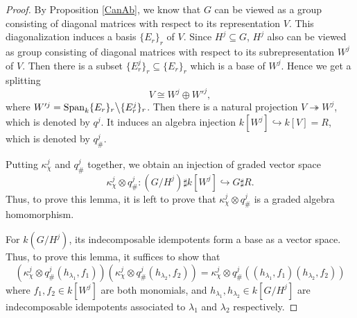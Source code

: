 \documentclass[11pt,reqno]{amsart}
\theoremstyle{definition}
\begin{document}
\begin{proof}
By Proposition \ref{CanAb}, we know that $G$ can be viewed as a
group consisting of diagonal matrices with respect to its 
representation $V$. This diagonalization induces a basis $\{E_r \}_r$ of $V$. 
Since $H^j \subseteq G$, 
$H^j$ also can be viewed as 
group consisting of diagonal matrices with respect to its 
subrepresentation $W^j$ of $V$. Then there is a subset 
$\{E^j_r\}_r \subseteq \{E_r \}_r$ which is a base of $W^j$.  
Hence we get a splitting
$$V \cong W^j \oplus W'^j,$$
where $W'^j = 
\mathrm{Span}_{k} \{E_r \}_r 
\big\backslash \{E^j_r\}_r$. 
Then there is a natural projection 
$V \twoheadrightarrow W^j$, which is 
denoted by $q^j$. 
It induces an algebra injection 
$k[W^j] \hookrightarrow k[V] = R$, 
which is denoted by $q^j_{\#}$. 

Putting 
$\kappa^{j}_{\chi}$ and $q^j_{\#}$ together, 
we obtain an injection of graded vector space 
$$
\kappa^{j}_{\chi} \otimes q^j_{\#}: (G / H^j) \sharp k[W^{j}] \hookrightarrow G \sharp R. 
$$
Thus, to prove this lemma, it is left to prove that $\kappa^{j}_{\chi} 
\otimes q^j_{\#}$ is a graded algebra homomorphism. 

For $k(G / H^j)$, its indecomposable idempotents form 
a base
as a vector space. Thus, to prove this lemma, it suffices to show that 
$$
(\kappa^{j}_{\chi} \otimes q^j_{\#}(h_{\lambda_1}, f_1) )
 (\kappa^{j}_{\chi} \otimes q^j_{\#}(h_{\lambda_2}, f_2) ) = 
\kappa^{j}_{\chi} \otimes q^j_{\#}((h_{\lambda_1}, f_1)(h_{\lambda_2}, f_2) )
$$
where $f_1, f_2 \in k[W^j]$ are both monomials, 
and $h_{\lambda_1}, h_{\lambda_2} \in k[G/H^j]$ are indecomposable 
idempotents associated 
to $\lambda_1$ and $\lambda_2$ respectively. 


\end{proof}
\end{document}
